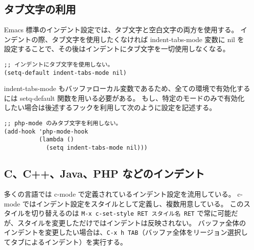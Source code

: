 \subsection{タブ文字の利用}
Emacs 標準のインデント設定では、タブ文字と空白文字の両方を使用する。
インデントの際、タブ文字を使用したくなければ indent-tabs-mode 変数に nil を設定することで、その後はインデントにタブ文字を一切使用しなくなる。
\begin{mdframed}[roundcorner=0.50zw,leftmargin=3.00zw,rightmargin=3.00zw,skipabove=0.40zw,skipbelow=0.40zw,innertopmargin=4.00pt,innerbottommargin=4.00pt,innerleftmargin=5.00pt,innerrightmargin=5.00pt,linecolor=gray!020,linewidth=0.50pt,backgroundcolor=gray!20]
\begin{verbatim}
;; インデントにタブ文字を使用しない。
(setq-default indent-tabs-mode nil)
\end{verbatim}
\end{mdframed}
indent-tabs-mode もバッファローカル変数であるため、全ての環境で有効化するには setq-default 関数を用いる必要がある。
もし、特定のモードのみで有効化したい場合は後述するフックを利用して次のように設定を記述する。
\begin{mdframed}[roundcorner=0.50zw,leftmargin=3.00zw,rightmargin=3.00zw,skipabove=0.40zw,skipbelow=0.40zw,innertopmargin=4.00pt,innerbottommargin=4.00pt,innerleftmargin=5.00pt,innerrightmargin=5.00pt,linecolor=gray!020,linewidth=0.50pt,backgroundcolor=gray!20]
\begin{verbatim}
;; php-mode のみタブ文字を利用しない。
(add-hook 'php-mode-hook
          (lambda ()
            (setq indent-tabs-mode nil)))
\end{verbatim}
\end{mdframed}
\subsection{C、C++、Java、PHP などのインデント}
多くの言語では c-mode で定義されているインデント設定を流用している。
c-mode ではインデント設定をスタイルとして定義し、複数用意している。
このスタイルを切り替えるのは \texttt{M-x c-set-style RET スタイル名 RET} で常に可能だが、スタイルを変更しただけではインデントは反映されない。
バッファ全体のインデントを変更したい場合は、\texttt{C-x h TAB}（バッファ全体をリージョン選択してタブによるインデント）を実行する。\\

